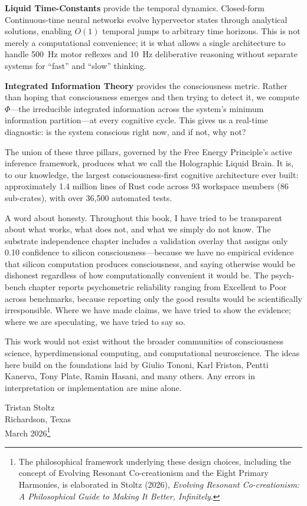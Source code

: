 \documentclass[12pt]{book}
\begin{document}
\textbf{Liquid Time-Constants} provide the temporal dynamics. Closed-form Continuous-time neural networks evolve hypervector states through analytical solutions, enabling $O(1)$ temporal jumps to arbitrary time horizons. This is not merely a computational convenience; it is what allows a single architecture to handle 500~Hz motor reflexes and 10~Hz deliberative reasoning without separate systems for ``fast'' and ``slow'' thinking.

\textbf{Integrated Information Theory} provides the consciousness metric. Rather than hoping that consciousness emerges and then trying to detect it, we compute $\Phi$---the irreducible integrated information across the system's minimum information partition---at every cognitive cycle. This gives us a real-time diagnostic: is the system conscious right now, and if not, why not?

The union of these three pillars, governed by the Free Energy Principle's active inference framework, produces what we call the Holographic Liquid Brain. It is, to our knowledge, the largest consciousness-first cognitive architecture ever built: approximately 1.4 million lines of Rust code across 93 workspace members (86 sub-crates), with over 36,500 automated tests.

A word about honesty. Throughout this book, I have tried to be transparent about what works, what does not, and what we simply do not know. The substrate independence chapter includes a validation overlay that assigns only 0.10 confidence to silicon consciousness---because we have no empirical evidence that silicon computation produces consciousness, and saying otherwise would be dishonest regardless of how computationally convenient it would be. The psych-bench chapter reports psychometric reliability ranging from Excellent to Poor across benchmarks, because reporting only the good results would be scientifically irresponsible. Where we have made claims, we have tried to show the evidence; where we are speculating, we have tried to say so.

This work would not exist without the broader communities of consciousness science, hyperdimensional computing, and computational neuroscience. The ideas here build on the foundations laid by Giulio Tononi, Karl Friston, Pentti Kanerva, Tony Plate, Ramin Hasani, and many others. Any errors in interpretation or implementation are mine alone.

\vspace{1cm}
\noindent Tristan Stoltz\\
Richardson, Texas\\
March 2026\footnote{The philosophical framework underlying these design choices, including the concept of Evolving Resonant Co-creationism and the Eight Primary Harmonies, is elaborated in Stoltz (2026), \textit{Evolving Resonant Co-creationism: A Philosophical Guide to Making It Better, Infinitely}.}
\end{document}
